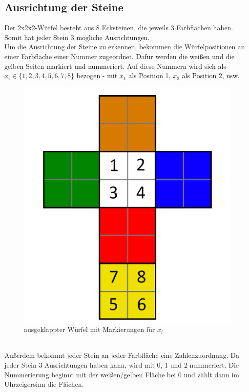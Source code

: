 \documentclass[12pt,a4paper, usenames, dvipsnames]{article}
\begin{document}
\subsection*{Ausrichtung der Steine} 
Der 2x2x2-Würfel besteht aus 8 Ecksteinen, die jeweils 3 Farbflächen haben. Somit hat jeder Stein 3 mögliche Ausrichtungen. \\
Um die Ausrichtung der Steine zu erkennen, bekommen die Würfelpositionen an einer Farbfläche einer Nummer zugeordnet. Dafür werden die weißen und die gelben Seiten markiert und nummeriert. Auf diese Nummern wird sich als $x_i \in \lbrace 1, 2, 3, 4, 5, 6, 7, 8 \rbrace$ bezogen - mit $x_1$ als Position 1, $x_2$ als Position 2, usw.
\begin{figure}[H]
\centering
\includegraphics[scale=0.1]{foldedout_numbers.png}
\caption{ausgeklappter Würfel mit Markierungen für $x_i$}
\end{figure}
\ \\
Außerdem bekommt jeder Stein an jeder Farbfläche eine Zahlenzuordnung. Da jeder Stein 3 Ausrichtungen haben kann, wird mit 0, 1 und 2 nummeriert. Die Nummerierung beginnt mit der weißen/gelben Fläche bei 0 und zählt dann im Uhrzeigersinn die Flächen. \\
\end{document}
